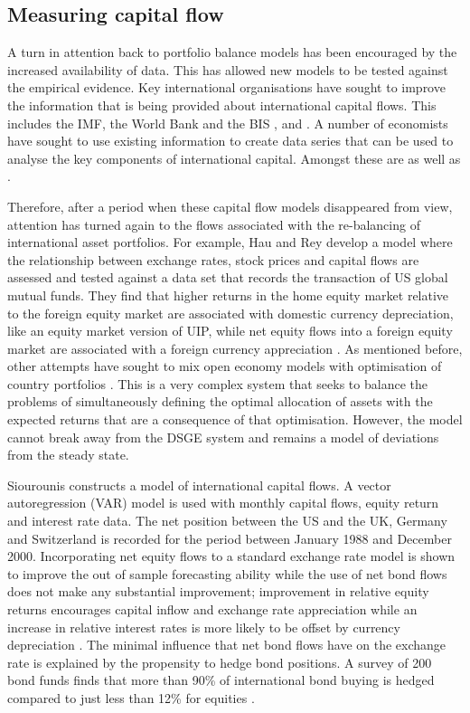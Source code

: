 \documentclass[12pt, a4paper, oneside]{article}\usepackage[]{graphicx}\usepackage[]{color}
\begin{document}
\subsection{Measuring capital flow}
A turn in attention back to portfolio balance models has been encouraged by the increased availability of data.  This has allowed new models to be tested against  the empirical evidence.  Key international organisations have sought to improve the information that is being provided about international capital flows. This includes the IMF, the World Bank and the BIS \citep{website:imfportfolio}, \citep{website:worldbankdebt} and  \citep{website:bisdata}. A number of economists have sought to use existing information to create data series that can be used to analyse the key components of international capital.  Amongst these are \citep{PLane2007} as well as \citep{BoEdata}. 

Therefore, after a period when these capital flow models disappeared from view, attention has turned again to the flows associated with the re-balancing of international asset portfolios.  For example, Hau and Rey develop a model where the relationship between exchange rates, stock prices and capital flows are assessed and tested against a data set that records the transaction of US global mutual funds.  They find that higher returns in the home equity market relative to the foreign equity market are associated with domestic currency depreciation, like an equity market version of UIP, while net equity flows into a foreign equity market are associated with a foreign currency appreciation \citep{HauEquity}.  As mentioned before, other attempts have sought to mix open economy models with optimisation of country portfolios \citep{Devereux2011Portfolio}.  This is a very complex system that seeks to balance the problems of simultaneously defining the optimal allocation of assets with the expected returns that are a consequence of that optimisation.  However, the model cannot break away from the DSGE system and remains a model of deviations from the steady state.  

Siourounis constructs a model of international capital flows.  A vector autoregression (VAR) model is used with monthly capital flows, equity return and interest rate data.  The net position between the US and the UK, Germany and Switzerland is recorded for the period between January 1988 and December 2000.   Incorporating net equity flows to a standard exchange rate model is shown to improve the out of sample forecasting ability while the use of net bond flows does not make any substantial improvement; improvement in relative equity returns encourages capital inflow and exchange rate appreciation while an increase in relative interest rates is more likely to be offset by currency depreciation \citep{Siourounis2004Capital}.   The minimal influence that net bond flows have on the exchange rate is explained by the propensity to hedge bond positions.  A survey of 200 bond funds finds that more than 90\% of international bond buying is hedged compared to just less than 12\% for equities \citep[p. 3]{Siourounis2004Capital}.  
\end{document}
